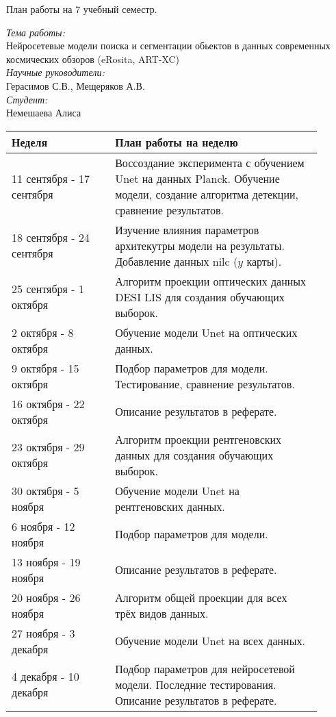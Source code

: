 \documentclass{article}
\begin{document}
\begin{center}
{\huge План работы на 7 учебный семестр.}\\
\end{center}
\textit{Тема работы:}\\
Нейросетевые модели поиска и сегментации обьектов в данных современных космических обзоров (eRosita, ART-XC)\\
\textit{Научные руководители:}\\
Герасимов С.В., Мещеряков А.В.\\
\textit{Студент:}\\
Немешаева Алиса\\
    \begin{table}[h!]
        \begin{tabular}{|p{0.3\linewidth}|p{0.6\linewidth}|}
            \hline
            \textbf{Неделя} & \textbf{План работы на неделю}\\
            \hline
            11 сентября - 17 сентября & Воссоздание эксперимента с обучением Unet на данных 
                Planck. Обучение модели, создание алгоритма детекции, сравнение результатов.\\ 
            18 сентября - 24 сентября & Изучение влияния параметров архитекутры модели на результаты.
                Добавление данных nilc ($y$ карты).\\
        \hline
            25 сентября - 1 октября & Алгоритм проекции оптических данных DESI LIS для создания 
                обучающих выборок.\\
            2 октября - 8 октября & Обучение модели Unet на оптических данных. \\
            9 октября - 15 октября & Подбор параметров для модели. Тестирование, сравнение 
                результатов.\\
            16 октября - 22 октября & Описание результатов в реферате.\\
        \hline
            23 октября - 29 октября & Алгоритм проекции рентгеновских данных для создания обучающих 
                выборок.\\
            30 октября - 5 ноября & Обучение модели Unet на рентгеновских данных.\\
            6 ноября - 12 ноября & Подбор параметров для модели. \\
            13 ноября - 19 ноября & Описание результатов в реферате.\\
        \hline
            20 ноября - 26 ноября & Алгоритм общей проекции для всех трёх видов данных.\\
            27 ноября - 3 декабря & Обучение модели Unet на всех данных.\\
            4 декабря - 10 декабря & Подбор параметров для нейросетевой модели. 
                Последние тестирования. Описание результатов в реферате.\\
            \hline
        \end{tabular}
    \end{table}
\end{document}
